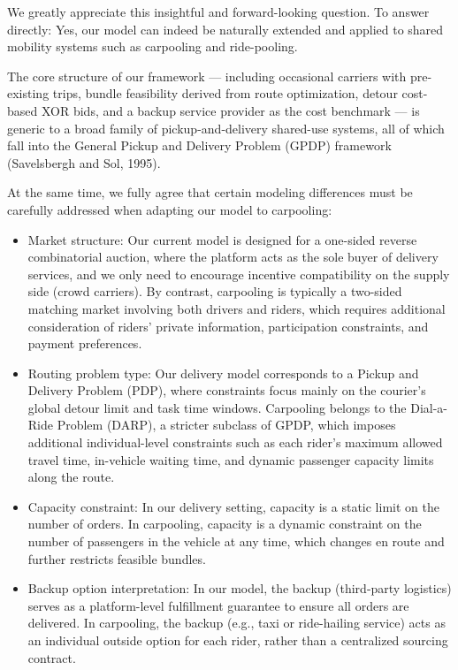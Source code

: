 \begin{revresponse}[1.1.2]
    We greatly appreciate this insightful and forward-looking question. To answer directly: Yes, our model can indeed be naturally extended and applied to shared mobility systems such as carpooling and ride-pooling. 
    
    The core structure of our framework — including occasional carriers with pre-existing trips, bundle feasibility derived from route optimization, detour cost-based XOR bids, and a backup service provider as the cost benchmark — is generic to a broad family of pickup-and-delivery shared-use systems, all of which fall into the General Pickup and Delivery Problem (GPDP) framework (Savelsbergh and Sol, 1995). 

    At the same time, we fully agree that certain modeling differences must be carefully addressed when adapting our model to carpooling:
    \begin{itemize}
        \item Market structure: Our current model is designed for a one-sided reverse combinatorial auction, where the platform acts as the sole buyer of delivery services, and we only need to encourage incentive compatibility on the supply side (crowd carriers). By contrast, carpooling is typically a two-sided matching market involving both drivers and riders, which requires additional consideration of riders' private information, participation constraints, and payment preferences.
        \item Routing problem type: Our delivery model corresponds to a Pickup and Delivery Problem (PDP), where constraints focus mainly on the courier’s global detour limit and task time windows. Carpooling belongs to the Dial-a-Ride Problem (DARP), a stricter subclass of GPDP, which imposes additional individual-level constraints such as each rider’s maximum allowed travel time, in-vehicle waiting time, and dynamic passenger capacity limits along the route.
        \item Capacity constraint: In our delivery setting, capacity is a static limit on the number of orders. In carpooling, capacity is a dynamic constraint on the number of passengers in the vehicle at any time, which changes en route and further restricts feasible
        bundles.
        \item Backup option interpretation: In our model, the backup (third-party logistics) serves as a platform-level fulfillment guarantee to ensure all orders are delivered. In carpooling, the backup (e.g., taxi or ride-hailing service) acts as an individual outside option for each rider, rather than a centralized sourcing contract. 

\end{itemize}
\end{revresponse}
